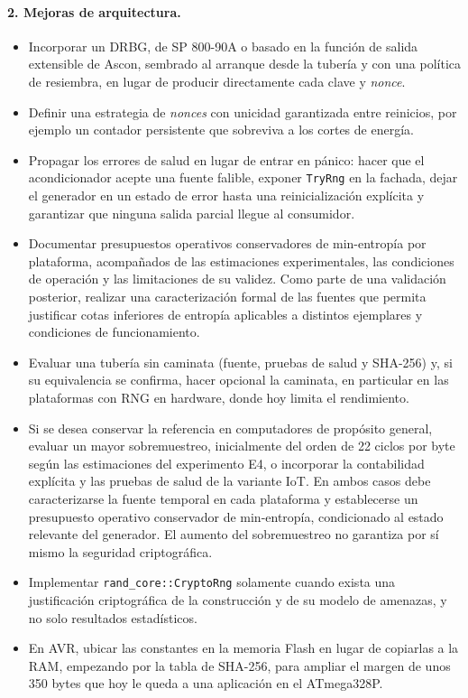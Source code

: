\paragraph{2. Mejoras de arquitectura.}
\begin{itemize}
    \item Incorporar un DRBG, de SP 800-90A o basado en la función de salida extensible de Ascon, sembrado al arranque desde la tubería y con una política de resiembra, en lugar de producir directamente cada clave y \textit{nonce}.
    \item Definir una estrategia de \textit{nonces} con unicidad garantizada entre reinicios, por ejemplo un contador persistente que sobreviva a los cortes de energía.
    \item Propagar los errores de salud en lugar de entrar en pánico: hacer que el acondicionador acepte una fuente falible, exponer \texttt{TryRng} en la fachada, dejar el generador en un estado de error hasta una reinicialización explícita y garantizar que ninguna salida parcial llegue al consumidor.
    \item Documentar presupuestos operativos conservadores de min-entropía por plataforma, acompañados de las estimaciones experimentales, las condiciones de operación y las limitaciones de su validez. Como parte de una validación posterior, realizar una caracterización formal de las fuentes que permita justificar cotas inferiores de entropía aplicables a distintos ejemplares y condiciones de funcionamiento.
    \item Evaluar una tubería sin caminata (fuente, pruebas de salud y SHA-256) y, si su equivalencia se confirma, hacer opcional la caminata, en particular en las plataformas con RNG en hardware, donde hoy limita el rendimiento.
    \item Si se desea conservar la referencia en computadores de propósito general, evaluar un mayor sobremuestreo, inicialmente del orden de 22 ciclos por byte según las estimaciones del experimento E4, o incorporar la contabilidad explícita y las pruebas de salud de la variante IoT. En ambos casos debe caracterizarse la fuente temporal en cada plataforma y establecerse un presupuesto operativo conservador de min-entropía, condicionado al estado relevante del generador. El aumento del sobremuestreo no garantiza por sí mismo la seguridad criptográfica.
    \item Implementar \texttt{rand\_core::CryptoRng} solamente cuando exista una justificación criptográfica de la construcción y de su modelo de amenazas, y no solo resultados estadísticos.
    \item En AVR, ubicar las constantes en la memoria Flash en lugar de copiarlas a la RAM, empezando por la tabla de SHA-256, para ampliar el margen de unos 350 bytes que hoy le queda a una aplicación en el ATmega328P.
\end{itemize}

